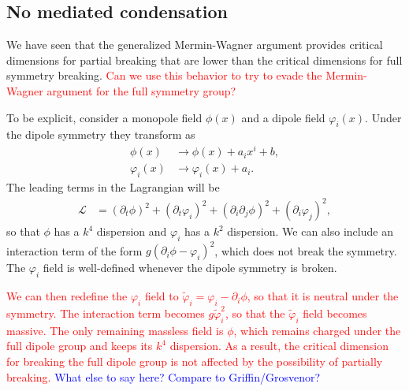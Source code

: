 \documentclass[pra,aps,twocolumn, amsfonts,amsmath,amssymb,nofootinbib,superscriptaddress]{revtex4}
\newcommand{\note}[1]{\textcolor{red}{#1}}
\newcommand{\charlie}[1]{\textcolor{Blue}{#1}}
\newcommand{\nn}{\nonumber\\}
\newcommand{\goesto}{\rightarrow}
\renewcommand{\max}{\text{max}}
\begin{document}
\subsection{No mediated condensation} \label{sub:mediated}

We have seen that the generalized Mermin-Wagner argument provides critical dimensions for partial breaking that are lower than the critical dimensions for full symmetry breaking. \note{Can we use this behavior to try to evade the Mermin-Wagner argument for the full symmetry group?}


To be explicit, consider a monopole field $\phi(x)$ and a dipole field $\varphi_i(x)$. Under the dipole symmetry they transform as 
\begin{align}
\phi(x) &\goesto \phi(x) + a_ix^i + b,\nn
\varphi_i(x) &\goesto \varphi_i(x) + a_i.
\end{align}
The leading terms in the Lagrangian will be
\begin{align}
\mathcal{L} &= (\partial_t \phi)^2 + (\partial_t \varphi_i)^2 + (\partial_i \partial_j \phi)^2 + (\partial_i \varphi_j)^2,
\end{align}
so that $\phi$ has a $k^4$ dispersion and $\varphi_i$ has a $k^2$ dispersion. We can also include an interaction term of the form $g(\partial_i \phi - \varphi_i)^2$, which does not break the symmetry.  The $\varphi_i$ field is well-defined whenever the dipole symmetry is broken.

\note{We can then redefine the $\varphi_i$ field to $\tilde{\varphi}_i = \varphi_i - \partial_i \phi$, so that it is neutral under the symmetry. The interaction term becomes $g\tilde{\varphi}_i^2$, so that the $\tilde{\varphi}_i$ field becomes massive. The only remaining massless field is $\phi$, which remains charged under the full dipole group and keeps its $k^4$ dispersion. As a result, the critical dimension for breaking the full dipole group is not affected by the possibility of partially breaking.
}
\charlie{What else to say here? Compare to Griffin/Grosvenor?}
\end{document}
